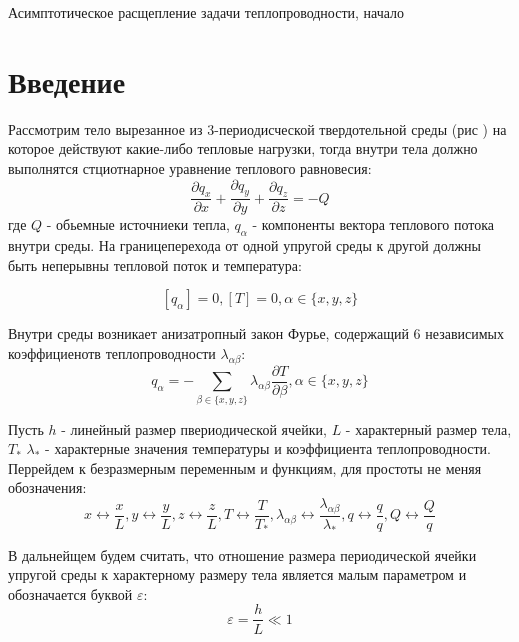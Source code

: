 \begin{center}
    \Huge{Асимптотическое расщепление задачи теплопроводности, начало}
\end{center}

\section{Введение}

Рассмотрим тело вырезанное из 3-периодисческой твердотельной среды (рис ) на которое действуют какие-либо тепловые нагрузки, тогда внутри тела должно выполнятся
стциотнарное уравнение теплового равновесия:
\begin{equation}
    \label{heat_equation}
    \frac{\partial q_x}{\partial x} + \frac{\partial q_y}{\partial y} + \frac{\partial q_z}{\partial z} = -Q
\end{equation}
где 
$Q$
- обьемные источниеки тепла, 
$q_\alpha$ 
- компоненты вектора теплового потока внутри среды.
На границеперехода от одной упругой среды к другой должны быть неперывны тепловой поток и температура:

\begin{equation}
    \label{hc_eq2}
    \left[ q_\alpha \right] = 0, \left[ T \right] = 0, \alpha \in \{ x,y,z \}
\end{equation}

Внутри среды возникает анизатропный закон Фурье, содержащий 6 независимых коэффициенотв теплопроводности 
$\lambda_{\alpha \beta}$:
\begin{equation}
    \label{hc_law}
    q_{\alpha} = - \sum_{\beta \in \{x,y,z\}}\lambda_{\alpha \beta}\frac{\partial T}{\partial \beta}, \alpha \in \{x,y,z\}
\end{equation}

Пусть 
$h$
- линейный размер пвериодической ячейки, 
$L$
- характерный размер тела, 
$T_{\ast}$ $\lambda_{\ast}$ 
- характерные значения температуры и коэффициента 
теплопроводности. Перрейдем к безразмерным переменным и функциям, для простоты не меняя обозначения:
\begin{equation}
x \leftrightarrow \frac{x}{L}, 
y \leftrightarrow \frac{y}{L}, 
z \leftrightarrow \frac{z}{L},
T \leftrightarrow \frac{T}{T_{\ast}},
\lambda_{\alpha \beta} \leftrightarrow \frac{\lambda_{\alpha \beta}}{\lambda_{\ast}},
q \leftrightarrow \frac{q}{q},
Q \leftrightarrow \frac{Q}{q}
\end{equation}

В дальнейщем будем считать, что отношение размера периодической ячейки упругой среды к характерному размеру тела является малым 
параметром и обозначается буквой 
$\varepsilon$:
\begin{equation}
    \varepsilon = \frac{h}{L} \ll 1
\end{equation}

